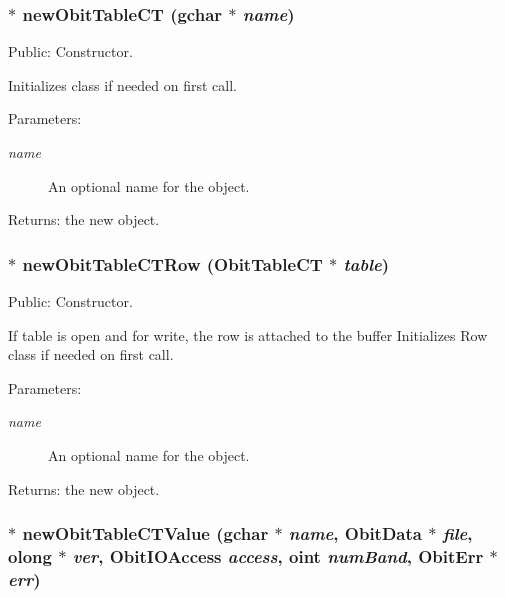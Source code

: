 \subsubsection{$\ast$ new\-Obit\-Table\-CT (gchar $\ast$ {\em name})}\label{ObitTableCT_8c_a16}


Public: Constructor. 

Initializes class if needed on first call. \begin{Desc}
\item[Parameters:]
\begin{description}
\item[{\em name}]An optional name for the object. \end{description}
\end{Desc}
\begin{Desc}
\item[Returns:]the new object. \end{Desc}
\subsubsection{$\ast$ new\-Obit\-Table\-CTRow ({\bf Obit\-Table\-CT} $\ast$ {\em table})}\label{ObitTableCT_8c_a14}


Public: Constructor. 

If table is open and for write, the row is attached to the buffer Initializes Row class if needed on first call. \begin{Desc}
\item[Parameters:]
\begin{description}
\item[{\em name}]An optional name for the object. \end{description}
\end{Desc}
\begin{Desc}
\item[Returns:]the new object. \end{Desc}
\subsubsection{$\ast$ new\-Obit\-Table\-CTValue (gchar $\ast$ {\em name}, {\bf Obit\-Data} $\ast$ {\em file}, {\bf olong} $\ast$ {\em ver}, Obit\-IOAccess {\em access}, {\bf oint} {\em num\-Band}, {\bf Obit\-Err} $\ast$ {\em err})}\label{ObitTableCT_8c_a18}


